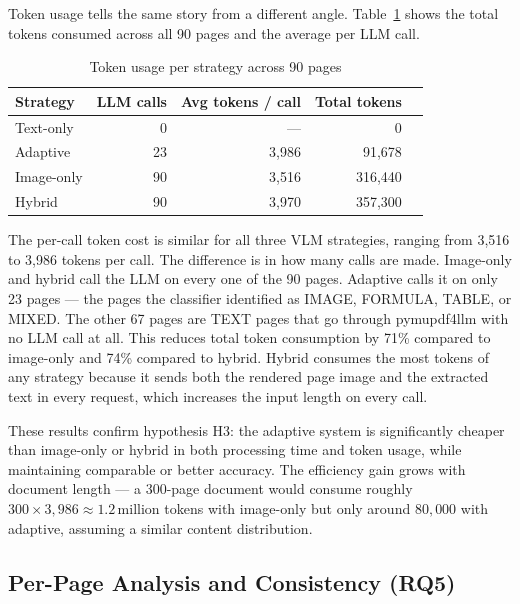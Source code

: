 \documentclass[12pt]{article}
\begin{document}
Token usage tells the same story from a different angle.
Table~\ref{tab:tokens} shows the total tokens consumed across all 90 pages
and the average per LLM call.

\begin{table}[h!]
\centering
\caption{Token usage per strategy across 90 pages}
\label{tab:tokens}
\renewcommand{\arraystretch}{1.4}
\begin{tabular}{lrrrr}
\toprule
\textbf{Strategy} & \textbf{LLM calls} & \textbf{Avg tokens / call} & \textbf{Total tokens} \\
\midrule
Text-only  & 0  & ---     & 0       \\
Adaptive   & 23 & 3{,}986 & 91{,}678  \\
Image-only & 90 & 3{,}516 & 316{,}440 \\
Hybrid     & 90 & 3{,}970 & 357{,}300 \\
\bottomrule
\end{tabular}
\end{table}

The per-call token cost is similar for all three VLM strategies, ranging
from 3{,}516 to 3{,}986 tokens per call. The difference is in how many
calls are made. Image-only and hybrid call the LLM on every one of the
90 pages. Adaptive calls it on only 23 pages — the pages the classifier
identified as IMAGE, FORMULA, TABLE, or MIXED. The other 67 pages are
TEXT pages that go through pymupdf4llm with no LLM call at all.
This reduces total token consumption by 71\% compared to image-only and
74\% compared to hybrid. Hybrid consumes the most tokens of any strategy
because it sends both the rendered page image and the extracted text in
every request, which increases the input length on every call.

These results confirm hypothesis H3: the adaptive system is significantly
cheaper than image-only or hybrid in both processing time and token usage,
while maintaining comparable or better accuracy. The efficiency gain grows
with document length — a 300-page document would consume roughly
$300 \times 3{,}986 \approx 1.2$\,million tokens with image-only but only
around $80{,}000$ with adaptive, assuming a similar content distribution.

\subsection{Per-Page Analysis and Consistency (RQ5)}
\end{document}
